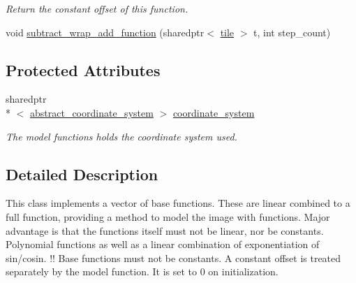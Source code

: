 \begin{DoxyCompactItemize}
\begin{DoxyCompactList}\small\item\em Return the constant offset of this function. \end{DoxyCompactList}\item 
void \hyperlink{classmodel__function_a16243e1bb23590acce533652d6eed732}{subtract\-\_\-wrap\-\_\-add\-\_\-function} (sharedptr$<$ \hyperlink{classtile}{tile} $>$ t, int step\-\_\-count)
\end{DoxyCompactItemize}
\subsection*{Protected Attributes}
\begin{DoxyCompactItemize}
\item 
\hypertarget{classmodel__function_ac27dd96bd16703d8015997a0e9011a33}{sharedptr\\*
$<$ \hyperlink{classabstract__coordinate__system}{abstract\-\_\-coordinate\-\_\-system} $>$ \hyperlink{classmodel__function_ac27dd96bd16703d8015997a0e9011a33}{coordinate\-\_\-system}}\label{classmodel__function_ac27dd96bd16703d8015997a0e9011a33}

\begin{DoxyCompactList}\small\item\em The model functions holds the coordinate system used. \end{DoxyCompactList}\end{DoxyCompactItemize}


\subsection{Detailed Description}
This class implements a vector of base functions. These are linear combined to a full function, providing a method to model the image with functions. Major advantage is that the functions itself must not be linear, nor be constants. Polynomial functions as well as a linear combination of exponentiation of sin/cosin. !! Base functions must not be constants. A constant offset is treated separately by the model function. It is set to 0 on initialization. 

